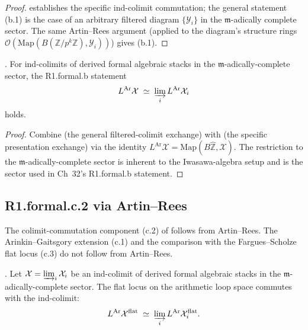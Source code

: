 \begin{proof}
 establishes the specific
ind-colimit commutation; the general statement (b.1) is the case
of an arbitrary filtered diagram \(\{\mathcal{Y}_{i}\}\) in the
\(\mathfrak{m}\)-adically complete sector. The same Artin--Rees
argument (applied to the diagram's structure rings
\(\mathcal{O}(\mathrm{Map}(B(\mathbb{Z}/p^{k}\mathbb{Z}),\mathcal{Y}_{i}))\))
gives (b.1).
\end{proof}

\begin{theorem}
\label{v4-arith:w5-i:thm:R1-formal-b-closes}
\ClaimStatusProvedHere. For ind-colimits of derived formal algebraic
stacks in the \(\mathfrak{m}\)-adically-complete sector, the R1.formal.b
statement
\[
L^{\mathrm{Ar}}\mathcal{X}\;\simeq\;\varinjlim_{i}L^{\mathrm{Ar}}\mathcal{X}_{i}
\]
holds.
\end{theorem}

\begin{proof}
Combine  (the general
filtered-colimit exchange) with
 (the specific presentation
exchange) via the identity
\(L^{\mathrm{Ar}}\mathcal{X}=\mathrm{Map}(B\widehat{\mathbb{Z}},\mathcal{X})\).
The restriction to the \(\mathfrak{m}\)-adically-complete sector is
inherent to the Iwasawa-algebra setup and is the sector used in
Ch~32's R1.formal.b statement.
\end{proof}

\subsection{R1.formal.c.2 via Artin--Rees}
\label{v4-arith:w5-i:R1-formal-c-closure}

The colimit-commutation component (c.2) of
 follows from
Artin--Rees. The Arinkin--Gaitsgory extension (c.1) and the comparison
with the Fargues--Scholze flat locus (c.3) do not follow from
Artin--Rees.

\begin{proposition}
\label{v4-arith:w5-i:prop:c2-closure}
\ClaimStatusProvedHere. Let \(\mathcal{X}=\varinjlim_{i}\mathcal{X}_{i}\)
be an ind-colimit of derived formal algebraic stacks in the
\(\mathfrak{m}\)-adically-complete sector. The flat locus on the
arithmetic loop space commutes with the ind-colimit:
\[
L^{\mathrm{Ar}}\mathcal{X}^{\mathrm{flat}}\;\simeq\;\varinjlim_{i}L^{\mathrm{Ar}}\mathcal{X}_{i}^{\mathrm{flat}}.
\]
\end{proposition}

